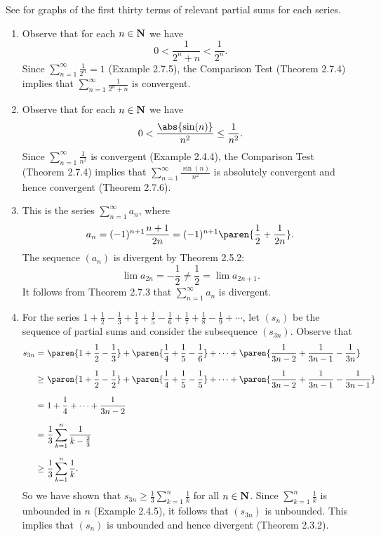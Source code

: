 \documentclass{lew98_solutions}
\begin{document}
\begin{solution}
    See  for graphs of the first thirty terms of relevant partial sums for each series.
    \begin{enumerate}
        \item Observe that for each \( n \in \mathbf{N} \) we have
        \[
            0 < \frac{1}{2^n + n} < \frac{1}{2^n}.
        \]
        Since \( \sum_{n=1}^{\infty} \tfrac{1}{2^n} = 1 \) (Example 2.7.5), the Comparison Test (Theorem 2.7.4) implies that \( \sum_{n=1}^{\infty} \tfrac{1}{2^n + n} \) is convergent.

        \item Observe that for each \( n \in \mathbf{N} \) we have
        \[
            0 < \frac{\abs{\sin(n)}}{n^2} \leq \frac{1}{n^2}.
        \]
        Since \( \sum_{n=1}^{\infty} \tfrac{1}{n^2} \) is convergent (Example 2.4.4), the Comparison Test (Theorem 2.7.4) implies that \( \sum_{n=1}^{\infty} \tfrac{\sin(n)}{n^2} \) is absolutely convergent and hence convergent (Theorem 2.7.6).

        \item This is the series \( \sum_{n=1}^{\infty} a_n \), where
        \[
            a_n = (-1)^{n+1} \frac{n + 1}{2n} = (-1)^{n+1} \paren{ \frac{1}{2} + \frac{1}{2n} }.
        \]
        The sequence \( (a_n) \) is divergent by Theorem 2.5.2:
        \[
            \lim a_{2n} = -\frac{1}{2} \neq \frac{1}{2} = \lim a_{2n+1}.
        \]
        It follows from Theorem 2.7.3 that \( \sum_{n=1}^{\infty} a_n \) is divergent.

        \item For the series \( 1 + \tfrac{1}{2} - \tfrac{1}{3} + \tfrac{1}{4} + \tfrac{1}{5} - \tfrac{1}{6} + \tfrac{1}{7} + \tfrac{1}{8} - \tfrac{1}{9} + \cdots \), let \( (s_n) \) be the sequence of partial sums and consider the subsequence \( (s_{3n}) \). Observe that
        \begin{align*}
            s_{3n} = \,\, & \paren{ 1 + \frac{1}{2} - \frac{1}{3} } + \paren{ \frac{1}{4} + \frac{1}{5} - \frac{1}{6} } + \cdots + \paren{ \frac{1}{3n - 2} + \frac{1}{3n - 1} - \frac{1}{3n} } \\[2mm]
            \geq \,\, & \paren{ 1 + \frac{1}{2} - \frac{1}{2} } + \paren{ \frac{1}{4} + \frac{1}{5} - \frac{1}{5} } + \cdots + \paren{ \frac{1}{3n - 2} + \frac{1}{3n - 1} - \frac{1}{3n - 1} } \\[2mm]
            = \,\, & 1 + \frac{1}{4} + \cdots + \frac{1}{3n - 2} \\[2mm]
            = \,\, & \frac{1}{3} \sum_{k=1}^n \frac{1}{k - \tfrac{2}{3}} \\[2mm]
            \geq \,\, & \frac{1}{3} \sum_{k=1}^n \frac{1}{k}.
        \end{align*}
        So we have shown that \( s_{3n} \geq \tfrac{1}{3} \sum_{k=1}^n \tfrac{1}{k} \) for all \( n \in \mathbf{N} \). Since \( \sum_{k=1}^n \tfrac{1}{k} \) is unbounded in \( n \) (Example 2.4.5), it follows that \( (s_{3n}) \) is unbounded. This implies that \( (s_n) \) is unbounded and hence divergent (Theorem 2.3.2).


\end{enumerate}
\end{solution}
\end{document}
